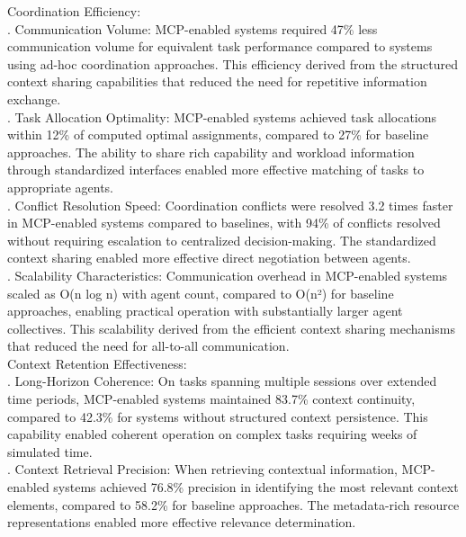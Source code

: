 Coordination Efficiency:\\ . Communication Volume: MCP-enabled systems required 47\% less communication volume for equivalent task performance compared to systems using ad-hoc coordination approaches. This efficiency derived from the structured context sharing capabilities that reduced the need for repetitive information exchange.\\ . Task Allocation Optimality: MCP-enabled systems achieved task allocations within 12\% of computed optimal assignments, compared to 27\% for baseline approaches. The ability to share rich capability and workload information through standardized interfaces enabled more effective matching of tasks to appropriate agents.\\ . Conflict Resolution Speed: Coordination conflicts were resolved 3.2 times faster in MCP-enabled systems compared to baselines, with 94\% of conflicts resolved without requiring escalation to centralized decision-making. The standardized context sharing enabled more effective direct negotiation between agents.\\ . Scalability Characteristics: Communication overhead in MCP-enabled systems scaled as O(n log n) with agent count, compared to O(n²) for baseline approaches, enabling practical operation with substantially larger agent collectives. This scalability derived from the efficient context sharing mechanisms that reduced the need for all-to-all communication.\\ \newline
Context Retention Effectiveness:\\ . Long-Horizon Coherence: On tasks spanning multiple sessions over extended time periods, MCP-enabled systems maintained 83.7\% context continuity, compared to 42.3\% for systems without structured context persistence. This capability enabled coherent operation on complex tasks requiring weeks of simulated time.\\ . Context Retrieval Precision: When retrieving contextual information, MCP-enabled systems achieved 76.8\% precision in identifying the most relevant context elements, compared to 58.2\% for baseline approaches. The metadata-rich resource representations enabled more effective relevance determination.\\ \newline

